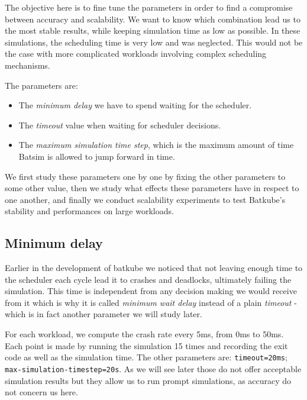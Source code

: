 The objective here is to fine tune the parameters in order to find a compromise
between accuracy and scalability. We want to know which combination lead us to
the most stable results, while keeping simulation time as low as possible. In
these simulations, the scheduling time is very low and was neglected.  This
would not be the case with more complicated workloads involving complex
scheduling mechanisms.

The parameters are:
\begin{itemize}
	\item The \textit{minimum delay} we have to spend waiting for the
		scheduler.
	\item The \textit{timeout} value when waiting for scheduler decisions.
	\item The \textit{maximum simulation time step}, which is the maximum
		amount of time Batsim is allowed to jump forward in time.
\end{itemize}

We first study these parameters one by one by fixing the other parameters to
some other value, then we study what effects these parameters have in respect
to one another, and finally we conduct scalability experiments to test
Batkube's stability and performances on large workloads.


\subsection{Minimum delay}

Earlier in the development of batkube we noticed that not leaving enough time
to the scheduler each cycle lead it to crashes and deadlocks, ultimately
failing the simulation. This time is independent from any decision making we
would receive from it which is why it is called \textit{minimum wait delay}
instead of a plain \textit{timeout} - which is in fact another parameter we
will study later.

For each workload, we compute the crash rate every 5ms, from 0ms to 50ms. Each
point is made by running the simulation 15 times and recording the exit code as
well as the simulation time. The other parameters are: \texttt{timeout=20ms};
\texttt{max-simulation-timestep=20s}. As we will see later those do not offer
acceptable simulation results but they allow us to run prompt simulations, as
accuracy do not concern us here.\\

